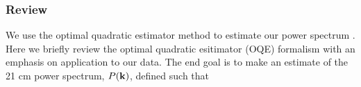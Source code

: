 \documentclass[twocolumn,numberedappendix]{emulateapj} \shorttitle{PSA64}
\begin{document}
%
%
\subsubsection{Review}
We use the optimal quadratic estimator method to estimate our power spectrum
\cite{dillon_et_al2013a, liu_tegmark2011}.
Here we briefly review the optimal quadratic esitimator (OQE) formalism with an
emphasis on application to our data. The end goal is to make an estimate of
the 21 cm power spectrum, $P(\mathbf{k})$, defined such that 
\end{document}
